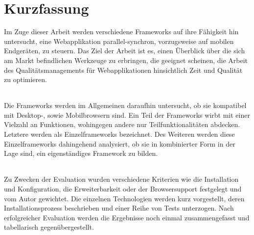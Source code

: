 \section*{Kurzfassung}
Im Zuge dieser Arbeit werden verschiedene Frameworks auf ihre Fähigkeit hin untersucht, eine Webapplikation \gls{parallel-synchron}, vorzugsweise auf mobilen Endgeräten, zu steuern. Das Ziel der Arbeit ist es, einen Überblick über die sich am Markt befindlichen Werkzeuge zu erbringen, die geeignet scheinen, die Arbeit des Qualitätsmanagements für Webapplikationen hinsichtlich Zeit und Qualität zu optimieren.

\\Die \Gls{Framework}s werden im Allgemeinen daraufhin untersucht, ob sie kompatibel mit Desktop-, sowie Mobilbrowsern sind. Ein Teil der Frameworks wirbt mit einer Vielzahl an Funktionen, wohingegen andere nur Teilfunktionalitäten abdecken. Letztere werden als Einzelframeworks bezeichnet. Des Weiteren werden diese Einzelframeworks dahingehend analysiert, ob sie in kombinierter Form in der Lage sind, ein eigenständiges \Gls{Framework} zu bilden.

\\ Zu Zwecken der Evaluation wurden verschiedene Kriterien wie die Installation und Konfiguration, die Erweiterbarkeit oder der Browsersupport festgelegt und vom Autor gewichtet. Die einzelnen Technologien werden kurz vorgestellt, deren Installationsprozess beschrieben und einer Reihe von Tests unterzogen. Nach erfolgreicher Evaluation werden die Ergebnisse noch einmal zusammengefasst und tabellarisch gegenübergestellt.


%
%

